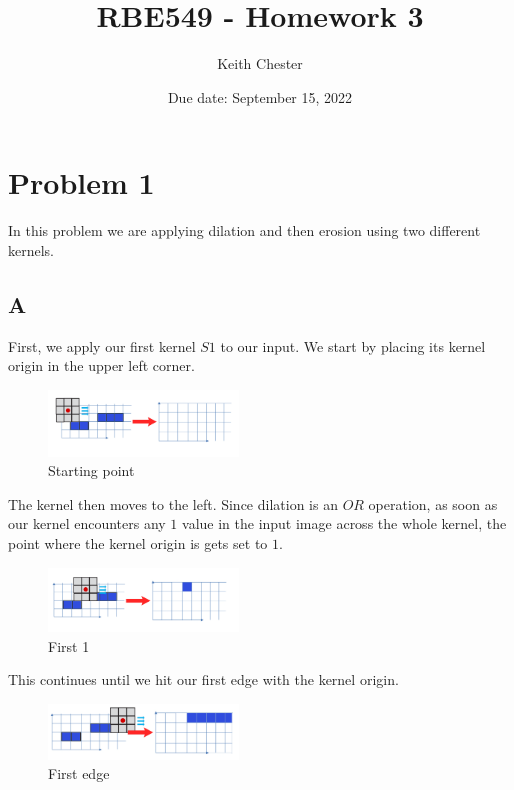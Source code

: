 \documentclass{article}
\title{RBE549 - Homework 3}
\author{Keith Chester}
\date{Due date: September 15, 2022}
\begin{document}
\maketitle

\section*{Problem 1}

In this problem we are applying dilation and then erosion using two different kernels.

\subsection*{A}

First, we apply our first kernel $S1$ to our input. We start by placing its kernel origin in the upper left corner.

\begin{figure}[H]
    \centering
    \includegraphics[width = 0.45\textwidth]{imgs/5/a1.png}
    \caption{Starting point}
    \label{fig:a1}
\end{figure}

The kernel then moves to the left. Since dilation is an $OR$ operation, as soon as our kernel encounters any $1$ value in the input image across the whole kernel, the point where the kernel origin is gets set to $1$.

\begin{figure}[H]
    \centering
    \includegraphics[width = 0.45\textwidth]{imgs/5/a2.png}
    \caption{First 1}
    \label{fig:a2}
\end{figure}

This continues until we hit our first edge with the kernel origin.

\begin{figure}[H]
    \centering
    \includegraphics[width = 0.45\textwidth]{imgs/5/a3.png}
    \caption{First edge}
    \label{fig:a3}
\end{figure}
\end{document}
